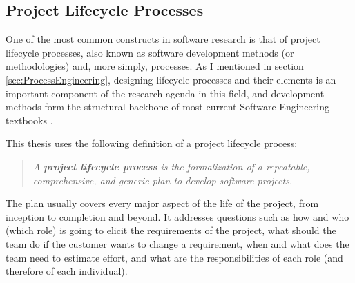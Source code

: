 \subsection{Project Lifecycle Processes}

One of the most common constructs in software research is that of project lifecycle processes, also known as software development methods (or methodologies) and, more simply, processes. As I mentioned in section \ref{sec:ProcessEngineering}, designing lifecycle processes and their elements is an important component of the research agenda in this field, and development methods form the structural backbone of most current Software Engineering textbooks \cite{Pressman2004,Pfleeger2001,Ghezzi2003}.

This thesis uses the following definition of a project lifecycle process:

\begin{quote}
\emph{A \textbf{project lifecycle process} is the formalization of a repeatable, comprehensive, and generic plan to develop software projects.}
\end{quote}

The plan usually covers every major aspect of the life of the project, from inception to completion and beyond. It addresses questions such as how and who (which role) is going to elicit the requirements of the project, what should the team do if the customer wants to change a requirement, when and what does the team need to estimate effort, and what are the responsibilities of each role (and therefore of each individual).

